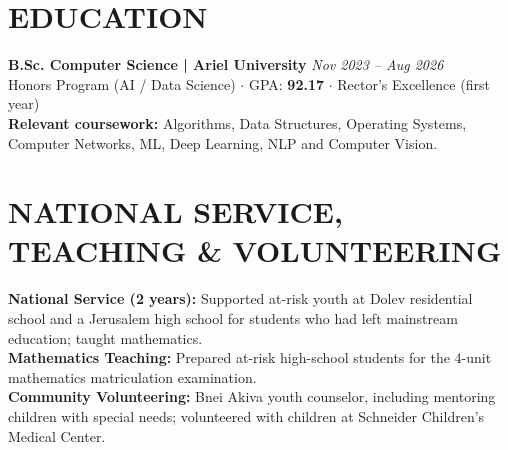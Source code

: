 \documentclass[10pt,a4paper]{article}
\begin{document}
\section*{EDUCATION}
\textbf{B.Sc. Computer Science \quad | \quad Ariel University} \hfill \textit{Nov 2023 -- Aug 2026}\\
Honors Program (AI / Data Science) \quad $\cdot$ \quad GPA: \textbf{92.17} \quad $\cdot$ \quad Rector's Excellence (first year)\\\textbf{Relevant coursework:} Algorithms, Data Structures, Operating Systems, Computer Networks, ML, Deep Learning, NLP and Computer Vision.
\section*{NATIONAL SERVICE, TEACHING \& VOLUNTEERING}
\textbf{National Service (2 years):} Supported at-risk youth at Dolev residential school and a Jerusalem high school for students who had left mainstream education; taught mathematics.\\
\textbf{Mathematics Teaching:} Prepared at-risk high-school students for the 4-unit mathematics matriculation examination.\\
\textbf{Community Volunteering:} Bnei Akiva youth counselor, including mentoring children with special needs; volunteered with children at Schneider Children's Medical Center.
\end{document}
